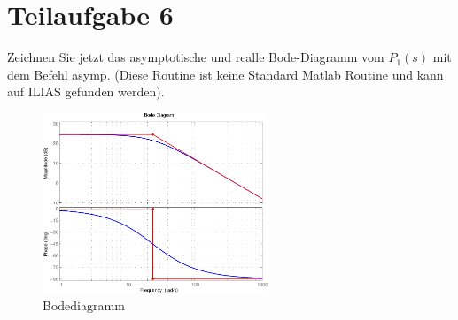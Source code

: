 \section{Teilaufgabe 6}
\begin{aufgabe}
    Zeichnen Sie jetzt das asymptotische und realle Bode-Diagramm vom $P_1(s)$ 
    mit dem Befehl asymp. (Diese Routine ist keine Standard Matlab Routine und 
    kann auf ILIAS gefunden werden).
\end{aufgabe}
\begin{figure}[h!]
    \centering
    \includegraphics[width=0.6\textwidth]{06/asymp_plot.pdf}
    \caption{Bodediagramm}
    \label{fig:06plot}
\end{figure}
